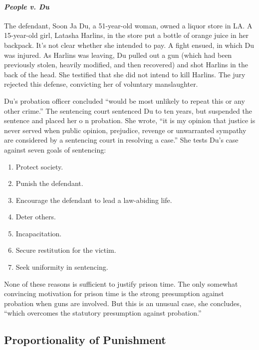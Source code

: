 \paragraph{\emph{People v. Du}}

The defendant, Soon Ja Du, a 51-year-old woman, owned a liquor store in LA. A 15-year-old girl, Latasha Harlins, in the store put a bottle of orange juice in her backpack. It's not clear whether she intended to pay. A fight ensued, in which Du was injured. As Harlins was leaving, Du pulled out a gun (which had been previously stolen, heavily modified, and then recovered) and shot Harlins in the back of the head. She testified that she did not intend to kill Harlins. The jury rejected this defense, convicting her of voluntary manslaughter.

Du's probation officer concluded ``would be most unlikely to repeat this or any other crime.'' The sentencing court sentenced Du to ten years, but suspended the sentence and placed her o n probation. She wrote, ``it is my opinion that justice is never served when public opinion, prejudice, revenge or unwarranted sympathy are considered by a sentencing court in resolving a case.'' She tests Du's case against seven goals of sentencing:

\begin{enumerate}
    \item Protect society.
    \item Punish the defendant.
    \item Encourage the defendant to lead a law-abiding life.
    \item Deter others.
    \item Incapacitation.
    \item Secure restitution for the victim.
    \item Seek uniformity in sentencing.
\end{enumerate}

None of these reasons is sufficient to justify prison time. The only somewhat convincing motivation for prison time is the strong presumption against probation when guns are involved. But this is an unusual case, she concludes, ``which overcomes the statutory presumption against probation.''

\subsection{Proportionality of Punishment}
